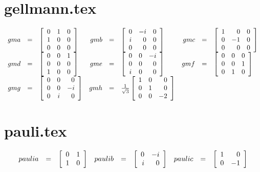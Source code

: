 \section{gellmann.tex}
\begin{equation}
  \begin{array}{rclrclrcl}
  gma &=&\gma & gmb &=&\gmb & gmc &=&\gmc \\
  gmd &=&\gmd & gme &=&\gme & gmf &=&\gmf \\
  gmg &=&\gmg & gmh &=&\gmh \\
  \end{array}
\end{equation}

\section{pauli.tex}
\begin{equation}
  \begin{array}{rclrclrcl}
  paulia &=&\paulia & paulib &=&\paulib & paulic &=&\paulic
  \end{array}
\end{equation}


\endinput